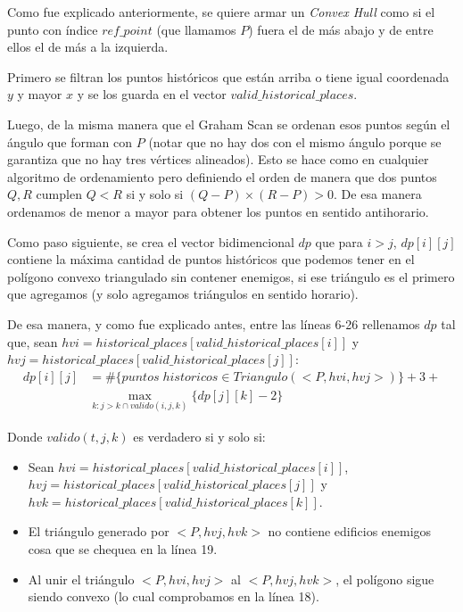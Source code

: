 Como fue explicado anteriormente, se quiere armar un \textit{Convex Hull} como si el punto con índice $ref\_point$
(que llamamos $P$) fuera el de más abajo y de entre ellos el de más a la izquierda.

Primero se filtran los puntos históricos que están arriba o tiene igual coordenada $y$ y mayor $x$ y se los guarda en 
el vector $valid\_historical\_places$.

Luego, de la misma manera que el Graham Scan se ordenan esos puntos según el ángulo que forman con $P$ (notar que no
hay dos con el mismo ángulo porque se garantiza que no hay tres vértices alineados). Esto se hace como en cualquier
algoritmo de ordenamiento pero definiendo el orden de manera que dos puntos $Q, R$ cumplen $Q < R$ si y solo si
$(Q-P) \times (R-P) > 0$. De esa manera ordenamos de menor a mayor para obtener los puntos en sentido antihorario.

Como paso siguiente, se crea el vector bidimencional $dp$ que para $i > j$, $dp[i][j]$ contiene la máxima cantidad de 
puntos históricos que podemos tener en el polígono convexo triangulado sin contener enemigos, si
ese triángulo es el primero que agregamos (y solo agregamos triángulos en sentido horario).

De esa manera, y como fue explicado antes, entre las líneas 6-26 rellenamos $dp$ tal que, sean 
$hvi = historical\_places[valid\_historical\_places[i]]$ y $hvj = historical\_places[valid\_historical\_places[j]]$:
\begin{equation*}
\begin{split}
    dp[i][j] & = \#\{ puntos\;historicos \in Triangulo(<P, hvi, hvj>)\} + 3 + \\
    & \max_{ k : j > k \cap valido(i,j,k) } \{dp[j][k]-2\}
\end{split}
\end{equation*}

Donde $valido(t,j,k)$ es verdadero si y solo si:
\begin{itemize}
\item Sean $hvi = historical\_places[valid\_historical\_places[i]]$, $hvj = historical\_places[valid\_historical\_places[j]]$ y
$hvk = historical\_places[valid\_historical\_places[k]]$.
\item El triángulo generado por $<P, hvj, hvk>$ no contiene edificios enemigos cosa que se chequea en la línea 19.
\item Al unir el triángulo $<P, hvi, hvj>$ al $<P, hvj, hvk>$, el polígono sigue siendo convexo (lo cual comprobamos en la línea 18).
\end{itemize}

